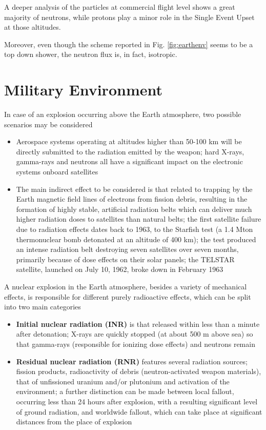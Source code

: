 \documentclass[./dissertation.tex]{subfiles}
\begin{document}
A deeper analysis of the particles at commercial flight level shows a great majority of neutrons, while protons play a minor role in the Single Event Upset at those altitudes.

Moreover, even though the scheme reported in Fig. \ref{fig:earthenv} seems to be a top down shower, the neutron flux is, in fact, isotropic.


\section{Military Environment}
In case of an explosion occurring above the Earth atmosphere, two possible scenarios may be considered
\begin{itemize}
    \item Aerospace  systems  operating  at  altitudes  higher  than  50-100  km  will  be directly  submitted  to  the radiation  emitted  by  the  weapon;  hard  X-rays,  gamma-rays  and  neutrons  all  have  a  significant  impact on the electronic systems onboard satellites
    \item The main indirect effect to be considered is that related to trapping by the Earth magnetic field lines of electrons from fission debris, resulting in the formation of highly stable, artificial radiation belts which  can  deliver  much  higher  radiation  doses  to  satellites  than  natural  belts;  the  first  satellite failure  due  to  radiation  effects  dates  back  to  1963,  to  the  Starfish  test  (a  1.4  Mton  thermonuclear bomb  detonated  at  an  altitude  of  400  km);  the  test  produced  an  intense  radiation  belt  destroying  seven  satellites  over  seven  months,  primarily  because  of  dose  effects  on  their  solar  panels;  the TELSTAR satellite, launched on July 10, 1962, broke down in February 1963
\end{itemize}

A nuclear explosion in the Earth atmosphere, besides a variety of mechanical effects, is responsible for different purely radioactive effects, which can be split into two main categories 
\begin{itemize}
    \item \textbf{Initial nuclear radiation (INR)} is that released within less than a minute after detonation; X-rays are quickly stopped (at about 500 m above sea) so that gamma-rays (responsible for ionizing dose effects) and neutrons remain 
    \item \textbf{Residual nuclear radiation (RNR)} features several radiation sources; fission products, radioactivity of debris  (neutron-activated  weapon  materials),  that  of  unfissioned  uranium  and/or  plutonium  and activation of the environment; a further distinction can be made between local fallout, occurring less than  24  hours  after  explosion,  with  a  resulting  significant  level  of  ground  radiation,  and  worldwide fallout, which can take place at significant distances from the place of explosion 
\end{itemize}
\end{document}
